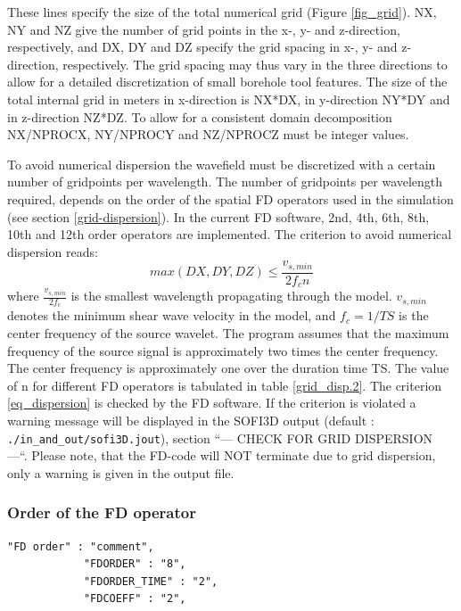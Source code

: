 \documentclass[11pt,onecolumn,oneside]{article}
\begin{document}
These lines specify the size of the total numerical grid (Figure  \ref{fig_grid}). NX, NY and NZ give the number of grid points in the x-, y- and z-direction, respectively, and DX, DY and DZ
specify the grid spacing in x-, y- and z-direction, respectively. The grid spacing may thus vary in the three directions to allow for a detailed discretization of small borehole tool features.
The size of the total internal grid in meters in x-direction is NX*DX, in y-direction NY*DY  and in z-direction NZ*DZ. To allow for a consistent domain decomposition NX/NPROCX, NY/NPROCY and NZ/NPROCZ must be integer values.

To avoid numerical dispersion the wavefield must be discretized with a certain number of gridpoints per wavelength. The number of gridpoints per wavelength required, depends on the order of the spatial
FD operators used in the simulation (see section \ref{grid-dispersion}). In the current FD software, 2nd, 4th, 6th, 8th, 10th and 12th order operators are implemented. The criterion to avoid numerical dispersion reads:
\begin{equation}
max(DX,DY,DZ)\le\frac{v_{s,min}}{2 f_c n} \label{eq_dispersion}
\end{equation}
where $\frac{v_{s,min}}{2 f_c}$ is the smallest wavelength propagating through the model. $v_{s,min}$ denotes the minimum shear wave velocity in the model, and $f_c=1/TS$ is the center frequency of the source wavelet. The program assumes that the maximum frequency of the source signal is approximately two times the center frequency. The center frequency is approximately one over the duration time TS. The value of n for different FD operators is tabulated in table \ref{grid_disp.2}. The criterion \ref{eq_dispersion} is checked by the FD software. If the criterion is violated a warning message will be displayed in the SOFI3D output (default :  \lstinline{./in_and_out/sofi3D.jout}), section ``--- CHECK FOR GRID DISPERSION ---``. Please note, that the FD-code will NOT terminate due to grid dispersion, only a warning is given in the output file.

\subsubsection{Order of the FD operator}

\begin{verbatim}
"FD order" : "comment",
			"FDORDER" : "8",
			"FDORDER_TIME" : "2",
			"FDCOEFF" : "2",
\end{verbatim}
\end{document}

